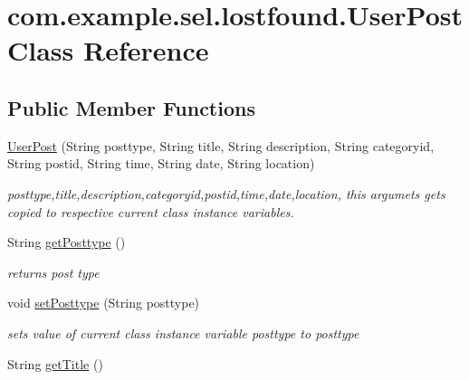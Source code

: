\hypertarget{classcom_1_1example_1_1sel_1_1lostfound_1_1UserPost}{\section{com.\-example.\-sel.\-lostfound.\-User\-Post \-Class \-Reference}
\label{classcom_1_1example_1_1sel_1_1lostfound_1_1UserPost}
}
\subsection*{\-Public \-Member \-Functions}
\begin{DoxyCompactItemize}
\item 
\hyperlink{classcom_1_1example_1_1sel_1_1lostfound_1_1UserPost_a44293053969c4f6a829ea18cdcc8da15}{\-User\-Post} (\-String posttype, \-String title, \-String description, \-String categoryid, \-String postid, \-String time, \-String date, \-String location)
\begin{DoxyCompactList}\small\item\em posttype,title,description,categoryid,postid,time,date,location, this argumets gets copied to respective current class instance variables. \end{DoxyCompactList}\item 
\hypertarget{classcom_1_1example_1_1sel_1_1lostfound_1_1UserPost_a65ec69de0023c60737a2c4ee195c6f67}{\-String \hyperlink{classcom_1_1example_1_1sel_1_1lostfound_1_1UserPost_a65ec69de0023c60737a2c4ee195c6f67}{get\-Posttype} ()}\label{classcom_1_1example_1_1sel_1_1lostfound_1_1UserPost_a65ec69de0023c60737a2c4ee195c6f67}

\begin{DoxyCompactList}\small\item\em returns post type \end{DoxyCompactList}\item 
\hypertarget{classcom_1_1example_1_1sel_1_1lostfound_1_1UserPost_affed3b2cd85fcaed14e84f1fa1742fc3}{void \hyperlink{classcom_1_1example_1_1sel_1_1lostfound_1_1UserPost_affed3b2cd85fcaed14e84f1fa1742fc3}{set\-Posttype} (\-String posttype)}\label{classcom_1_1example_1_1sel_1_1lostfound_1_1UserPost_affed3b2cd85fcaed14e84f1fa1742fc3}

\begin{DoxyCompactList}\small\item\em sets value of current class instance variable posttype to posttype \end{DoxyCompactList}\item 
\hypertarget{classcom_1_1example_1_1sel_1_1lostfound_1_1UserPost_ae28343c4689b498bd501f9de21f37334}{\-String \hyperlink{classcom_1_1example_1_1sel_1_1lostfound_1_1UserPost_ae28343c4689b498bd501f9de21f37334}{get\-Title} ()}\label{classcom_1_1example_1_1sel_1_1lostfound_1_1UserPost_ae28343c4689b498bd501f9de21f37334}


\end{DoxyCompactItemize}
